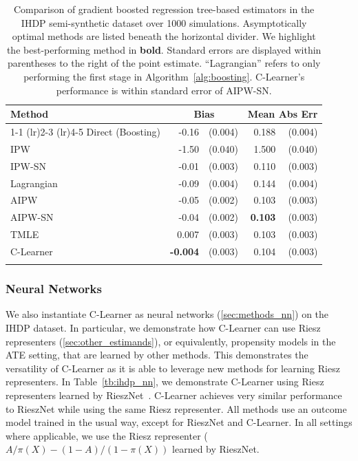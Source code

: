 \begin{table}[t]
\centering

\footnotesize
\begin{tabular}{lrrrr}
\toprule
Method & \multicolumn{2}{c}{Bias} & \multicolumn{2}{c}{Mean Abs Err} \\ 
\cmidrule(lr){1-1}
\cmidrule(lr){2-3}
\cmidrule(lr){4-5}
Direct (Boosting) & -0.16 & (0.004) & 0.188 & (0.004) \\
IPW & -1.50 & (0.040) & 1.500 & (0.040) \\ 
IPW-SN & -0.01 & (0.003) & 0.110 & (0.003) \\ 
Lagrangian & -0.09 & (0.004) & 0.144 & (0.004) \\
\greymidrule
AIPW & -0.05 & (0.002) & 0.103 & (0.003) \\ 
AIPW-SN & -0.04 & (0.002) & \textbf{0.103} & (0.003) \\ 
TMLE  & 0.007 & (0.003) & 0.103 & (0.003) \\ 
C-Learner & \textbf{-0.004} & (0.003) & 0.104 & (0.003) \\
\bottomrule
\vspace{0.1em}
\end{tabular}
\caption{Comparison of gradient boosted regression tree-based estimators in the IHDP semi-synthetic dataset over 1000 simulations. Asymptotically optimal methods are listed beneath the horizontal divider. We highlight the best-performing method in \textbf{bold}. Standard errors are displayed within parentheses to the right of the point estimate. ``Lagrangian'' refers to only performing the first stage in Algorithm~\ref{alg:boosting}. C-Learner’s performance is
within standard error of AIPW-SN.}
\label{tb:ihdp}
\end{table}






\subsubsection{Neural Networks}
\label{sec:ihdp_nn}
We also instantiate C-Learner as neural networks (\cref{sec:methods_nn}) on the IHDP dataset. 
In particular, we demonstrate how C-Learner can use Riesz representers (\ref{sec:other_estimands}), or equivalently, propensity models in the ATE setting, that are
learned by other methods.
This demonstrates the versatility of C-Learner as it is able to leverage new methods for learning Riesz representers. 
In Table~\ref{tb:ihdp_nn}, we demonstrate C-Learner using Riesz representers
learned by RieszNet~\citep{chernozhukov2022riesznet}. C-Learner achieves very similar performance to RieszNet while using the same Riesz representer. All methods use an outcome model trained in the usual way, except for RieszNet and C-Learner. In all settings where applicable, we use the Riesz representer ($A/\pi(X)-(1-A)/(1-\pi(X))$ learned by RieszNet.

